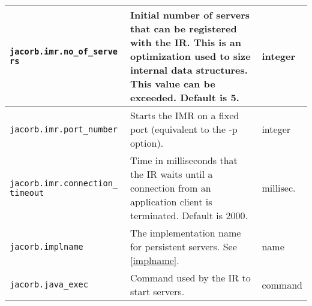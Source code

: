 \begin{small}
\begin{longtable}{|p{5cm}|p{9cm}|p{2cm}|}
\hline
\verb"jacorb.imr.no_of_serve"
\verb"rs" & Initial number of servers that can be registered with the IR. This is an optimization used to size internal data structures. This value can be exceeded. Default is 5. & integer \\
\hline
\verb"jacorb.imr.port_number" & Starts the IMR on a fixed port (equivalent to the -p option). & integer \\
\hline
\verb"jacorb.imr.connection_"
\verb"timeout" & Time in milliseconds that the IR waits until a connection from an application client is terminated. Default is 2000. & millisec. \\
\hline
\verb"jacorb.implname" & The implementation name for persistent servers. See \ref{implname}. & name \\
\hline
\verb"jacorb.java_exec" & Command used by the IR to start servers. & command \\
\hline
\end{longtable}
\end{small}


